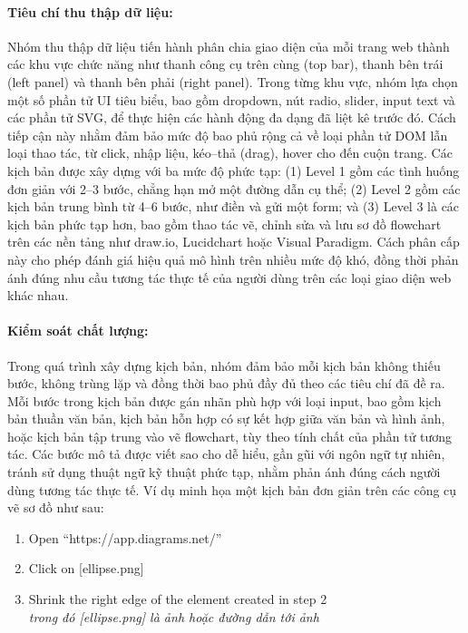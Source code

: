 \documentclass[a4paper, 12pt]{report}
\begin{document}
{\paragraph{Tiêu chí thu thập dữ liệu:}
Nhóm thu thập dữ liệu tiến hành phân chia giao diện của mỗi trang web thành các khu vực chức năng như thanh công cụ trên cùng (top bar), thanh bên trái (left panel) và thanh bên phải (right panel). Trong từng khu vực, nhóm lựa chọn một số phần tử UI tiêu biểu, bao gồm dropdown, nút radio, slider, input text và các phần tử SVG, để thực hiện các hành động đa dạng đã liệt kê trước đó. Cách tiếp cận này nhằm đảm bảo mức độ bao phủ rộng cả về loại phần tử DOM lẫn loại thao tác, từ click, nhập liệu, kéo–thả (drag), hover cho đến cuộn trang. Các kịch bản được xây dựng với ba mức độ phức tạp: (1) Level 1 gồm các tình huống đơn giản với 2–3 bước, chẳng hạn mở một đường dẫn cụ thể; (2) Level 2 gồm các kịch bản trung bình từ 4–6 bước, như điền và gửi một form; và (3) Level 3 là các kịch bản phức tạp hơn, bao gồm thao tác vẽ, chỉnh sửa và lưu sơ đồ flowchart trên các nền tảng như draw.io, Lucidchart hoặc Visual Paradigm. Cách phân cấp này cho phép đánh giá hiệu quả mô hình trên nhiều mức độ khó, đồng thời phản ánh đúng nhu cầu tương tác thực tế của người dùng trên các loại giao diện web khác nhau.


\paragraph{Kiểm soát chất lượng:}



Trong quá trình xây dựng kịch bản, nhóm đảm bảo mỗi kịch bản không thiếu bước, không trùng lặp và đồng thời bao phủ đầy đủ theo các tiêu chí đã đề ra. Mỗi bước trong kịch bản được gán nhãn phù hợp với loại input, bao gồm kịch bản thuần văn bản, kịch bản hỗn hợp có sự kết hợp giữa văn bản và hình ảnh, hoặc kịch bản tập trung vào vẽ flowchart, tùy theo tính chất của phần tử tương tác. Các bước mô tả được viết sao cho dễ hiểu, gần gũi với ngôn ngữ tự nhiên, tránh sử dụng thuật ngữ kỹ thuật phức tạp, nhằm phản ánh đúng cách người dùng tương tác thực tế. Ví dụ minh họa một kịch bản đơn giản trên các công cụ vẽ sơ đồ như sau:

\begin{enumerate}[itemsep=0pt, parsep=0pt, leftmargin=3em]
    \item Open ``https://app.diagrams.net/''
    \item Click on [ellipse.png]
    \item Shrink the right edge of the element created in step 2 \\
    \textit{trong đó [ellipse.png] là ảnh hoặc đường dẫn tới ảnh}
\end{enumerate}

}
\end{document}
